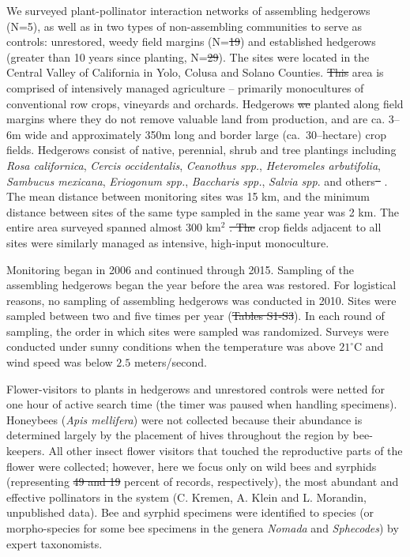 \documentclass[12pt]{article}
\providecommand{\DIFaddtex}[1]{{\protect\color{blue}\uwave{#1}}} %
\providecommand{\DIFdeltex}[1]{{\protect\color{red}\sout{#1}}}                      %
\providecommand{\DIFaddbegin}{} %
\providecommand{\DIFaddend}{} %
\providecommand{\DIFdelbegin}{} %
\providecommand{\DIFdelend}{} %
\providecommand{\DIFadd}[1]{\texorpdfstring{\DIFaddtex{#1}}{#1}} %
\providecommand{\DIFdel}[1]{\texorpdfstring{\DIFdeltex{#1}}{}} %
\begin{document}
We surveyed plant-pollinator interaction networks of assembling
hedgerows (N=5), as well as in two types of non-assembling communities
to serve as controls: unrestored, weedy field margins (N=\DIFdelbegin \DIFdel{19}\DIFdelend \DIFaddbegin \DIFadd{XX}\DIFaddend ) and
established hedgerows (greater than 10 years since planting,
N=\DIFdelbegin \DIFdel{29}\DIFdelend \DIFaddbegin \DIFadd{XX}\DIFaddend ). The sites were located in the Central Valley of California in
Yolo, Colusa and Solano Counties. \DIFdelbegin \DIFdel{This }\DIFdelend \DIFaddbegin \DIFadd{The }\DIFaddend area is comprised of
intensively managed agriculture -- primarily monocultures of
conventional row crops, vineyards and orchards. Hedgerows \DIFdelbegin \DIFdel{we }\DIFdelend \DIFaddbegin \DIFadd{were }\DIFaddend planted
along field margins where they do not remove valuable land from
production, and are ca. 3--6m wide and approximately 350m long and
border large (ca.\ 30--hectare) crop fields. Hedgerows consist of
native, perennial, shrub and tree plantings including \textit{Rosa
  californica}, \textit{Cercis occidentalis}, \textit{Ceanothus spp.},
\textit{Heteromeles arbutifolia}, \textit{Sambucus mexicana},
\textit{Eriogonum spp.}, \textit{Baccharis spp.}, \textit{Salvia
  spp}. and others\DIFdelbegin \DIFdel{\mbox{%
\citep{kremen-2015-602, mgonigle-2015-x}}%
}\DIFdelend . The mean distance between monitoring sites was 15
km, and the minimum distance between sites of the same type sampled in
the same year was 2 km.  The entire area surveyed spanned almost 300
km$^2$ \DIFdelbegin \DIFdel{. The }\DIFdelend \DIFaddbegin \DIFadd{and the }\DIFaddend crop fields adjacent to all sites were similarly managed
as intensive, high-input monoculture.

Monitoring began in 2006 and continued through 2015. Sampling of the
assembling hedgerows began the year before the area was restored. For
logistical reasons, no sampling of assembling hedgerows was conducted
in 2010. Sites were sampled between two and five times per year (\DIFdelbegin \DIFdel{Tables S1-S3}\DIFdelend \DIFaddbegin \DIFadd{Table
XX}\DIFaddend ). In each round of sampling, the order in which sites were sampled
was randomized. Surveys were conducted under sunny conditions when the
temperature was above $21^{\circ}\mathrm{C}$ and wind speed was below
$2.5$ meters/second.

Flower-visitors to plants in hedgerows and unrestored controls were
netted for one hour of active search time (the timer was paused when
handling specimens). Honeybees (\textit{Apis mellifera}) were not
collected because their abundance is determined largely by the
placement of hives throughout the region by bee-keepers. All other
insect flower visitors that touched the reproductive parts of the
flower were collected; however, here we focus only on wild bees and
syrphids (representing \DIFdelbegin \DIFdel{49 and 19 }\DIFdelend \DIFaddbegin \DIFadd{XX and XX }\DIFaddend percent of records, respectively),
the most abundant and effective pollinators in the system (C. Kremen,
A. Klein and L. Morandin, unpublished data). Bee and syrphid specimens
were identified to species (or morpho-species for some bee specimens
in the genera \textit{Nomada} and \textit{Sphecodes}) by expert
taxonomists.
\end{document}

